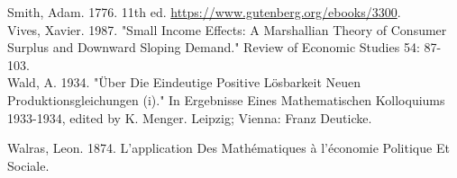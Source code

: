 \documentclass[10pt]{article}
\begin{document}
Smith, Adam. 1776. 11th ed. \href{https://www.gutenberg.org/ebooks/3300}{https://www.gutenberg.org/ebooks/3300}.\\
Vives, Xavier. 1987. "Small Income Effects: A Marshallian Theory of Consumer Surplus and Downward Sloping Demand." Review of Economic Studies 54: 87-103.\\
Wald, A. 1934. "Über Die Eindeutige Positive Lösbarkeit Neuen Produktionsgleichungen (i)." In Ergebnisse Eines Mathematischen Kolloquiums 1933-1934, edited by K. Menger. Leipzig; Vienna: Franz Deuticke.

Walras, Leon. 1874. L'application Des Mathématiques à l'économie Politique Et Sociale.
\end{document}
